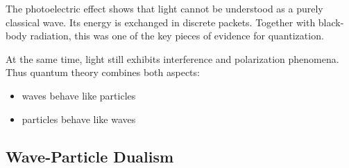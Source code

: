 




The photoelectric effect shows that light cannot be understood as a purely classical wave.
Its energy is exchanged in discrete packets.
Together with black-body radiation, this was one of the key pieces of evidence for quantization.

At the same time, light still exhibits interference and polarization phenomena.
Thus quantum theory combines both aspects:
\begin{itemize}
\item waves behave like particles
\item particles behave like waves
\end{itemize}






\subsection{Wave-Particle Dualism}

